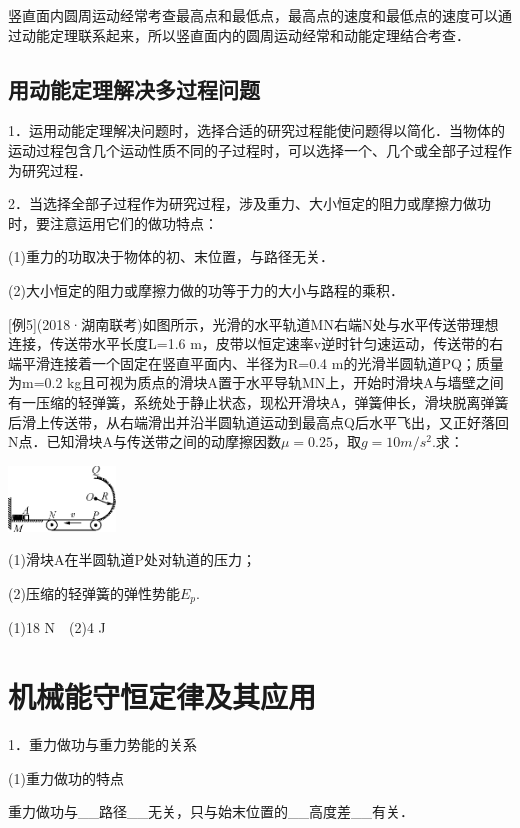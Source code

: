 竖直面内圆周运动经常考查最高点和最低点，最高点的速度和最低点的速度可以通过动能定理联系起来，所以竖直面内的圆周运动经常和动能定理结合考查．


\subsection{用动能定理解决多过程问题}

1．运用动能定理解决问题时，选择合适的研究过程能使问题得以简化．当物体的运动过程包含几个运动性质不同的子过程时，可以选择一个、几个或全部子过程作为研究过程．

2．当选择全部子过程作为研究过程，涉及重力、大小恒定的阻力或摩擦力做功时，要注意运用它们的做功特点：

(1)重力的功取决于物体的初、末位置，与路径无关．

(2)大小恒定的阻力或摩擦力做的功等于力的大小与路程的乘积．

{[}例5{]}(2018·湖南联考)如图所示，光滑的水平轨道MN右端N处与水平传送带理想连接，传送带水平长度L=1.6
m，皮带以恒定速率v逆时针匀速运动，传送带的右端平滑连接着一个固定在竖直平面内、半径为R=0.4
m的光滑半圆轨道PQ；质量为m=0.2
kg且可视为质点的滑块A置于水平导轨MN上，开始时滑块A与墙壁之间有一压缩的轻弹簧，系统处于静止状态，现松开滑块A，弹簧伸长，滑块脱离弹簧后滑上传送带，从右端滑出并沿半圆轨道运动到最高点Q后水平飞出，又正好落回N点．已知滑块A与传送带之间的动摩擦因数$\mu=0.25$，取$g=10m/s^2$.求：

\begin{center}\includegraphics[width=1.12292in,height=0.68889in]{media/image227.png}\end{center}

(1)滑块A在半圆轨道P处对轨道的压力；

(2)压缩的轻弹簧的弹性势能$E_p$.
\begin{solution}
	(1)18 N　(2)4 J
\end{solution}

\newpage
\section{机械能守恒定律及其应用}


1．重力做功与重力势能的关系

(1)重力做功的特点

重力做功与\_\_路径\_\_无关，只与始末位置的\_\_高度差\_\_有关．

